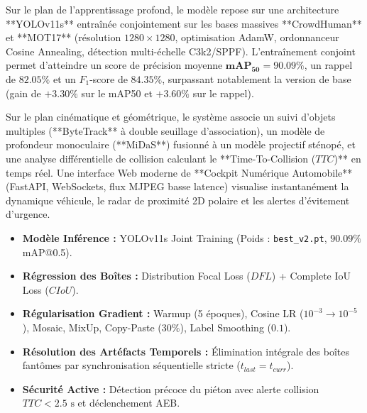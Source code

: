 \documentclass[11pt,a4paper]{article}
\begin{document}
Sur le plan de l'apprentissage profond, le modèle repose sur une architecture **YOLOv11s** entraînée conjointement sur les bases massives **CrowdHuman** et **MOT17** (résolution $1280\times 1280$, optimisation AdamW, ordonnanceur Cosine Annealing, détection multi-échelle C3k2/SPPF). L'entraînement conjoint permet d'atteindre un score de précision moyenne $\mathbf{mAP_{50} = 90.09\%}$, un rappel de $\mathbf{82.05\%}$ et un $F_1$-score de $\mathbf{84.35\%}$, surpassant notablement la version de base (gain de $+3.30\%$ sur le mAP50 et $+3.60\%$ sur le rappel).

Sur le plan cinématique et géométrique, le système associe un suivi d'objets multiples (**ByteTrack** à double seuillage d'association), un modèle de profondeur monoculaire (**MiDaS**) fusionné à un modèle projectif sténopé, et une analyse différentielle de collision calculant le **Time-To-Collision ($TTC$)** en temps réel. Une interface Web moderne de **Cockpit Numérique Automobile** (FastAPI, WebSockets, flux MJPEG basse latence) visualise instantanément la dynamique véhicule, le radar de proximité 2D polaire et les alertes d'évitement d'urgence.

\vspace{0.5cm}
\begin{tcolorbox}[colback=teal!5, colframe=teal!60!black, title=Faits Marquants \& Performances]
\begin{itemize}
    \item \textbf{Modèle Inférence :} YOLOv11s Joint Training (Poids : \texttt{best\_v2.pt}, $90.09\%$ mAP@0.5).
    \item \textbf{Régression des Boîtes :} Distribution Focal Loss ($DFL$) + Complete IoU Loss ($CIoU$).
    \item \textbf{Régularisation Gradient :} Warmup (5 époques), Cosine LR ($10^{-3} \to 10^{-5}$), Mosaic, MixUp, Copy-Paste ($30\%$), Label Smoothing ($0.1$).
    \item \textbf{Résolution des Artéfacts Temporels :} Élimination intégrale des boîtes fantômes par synchronisation séquentielle stricte ($t_{last} = t_{curr}$).
    \item \textbf{Sécurité Active :} Détection précoce du piéton avec alerte collision $TTC < 2.5\text{ s}$ et déclenchement AEB.
\end{itemize}
\end{tcolorbox}

\newpage

\end{document}
